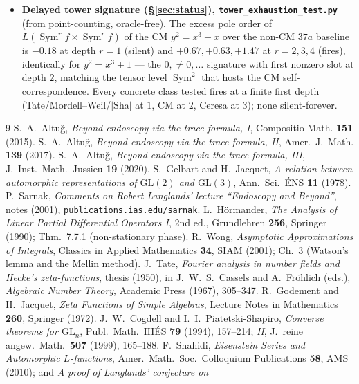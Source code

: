 \documentclass[11pt]{article}
\theoremstyle{definition}
\newcommand{\Sym}{\operatorname{Sym}}
\newcommand{\Sha}{\mathrm{Sha}}
\begin{document}
\begin{itemize}
\item \textbf{Delayed tower signature (\S\ref{sec:status}), \texttt{tower\_exhaustion\_test.py}}
(from point-counting, oracle-free). The excess pole order of $L(\Sym^r f\times\Sym^r f)$ of the CM
$y^2=x^3-x$ over the non-CM $37a$ baseline is $-0.18$ at depth $r=1$ (silent) and $+0.67,+0.63,+1.47$ at
$r=2,3,4$ (fires), identically for $y^2=x^3+1$ --- the $0,\neq0,\dots$ signature with first nonzero slot
at depth $2$, matching the tensor level $\Sym^2$ that hosts the CM self-correspondence. Every concrete
class tested fires at a finite first depth (Tate/Mordell--Weil/$|\Sha|$ at $1$, CM at $2$, Ceresa at $3$);
none silent-forever.
\end{itemize}

\begin{thebibliography}{9}
 S.~A.~Altu\u{g}, \emph{Beyond endoscopy via the trace formula, I}, Compositio Math.
\textbf{151} (2015).
 S.~A.~Altu\u{g}, \emph{Beyond endoscopy via the trace formula, II}, Amer.\ J.\ Math.
\textbf{139} (2017).
 S.~A.~Altu\u{g}, \emph{Beyond endoscopy via the trace formula, III}, J.\ Inst.\
Math.\ Jussieu \textbf{19} (2020).
 S.~Gelbart and H.~Jacquet, \emph{A relation between automorphic representations of
$\mathrm{GL}(2)$ and $\mathrm{GL}(3)$}, Ann.\ Sci.\ \'ENS \textbf{11} (1978).
\bibitem{Sar} P.~Sarnak, \emph{Comments on Robert Langlands' lecture ``Endoscopy and Beyond''}, notes
(2001), \texttt{publications.ias.edu/sarnak}.
 L.~H\"ormander, \emph{The Analysis of Linear Partial Differential Operators I},
2nd ed., Grundlehren \textbf{256}, Springer (1990); Thm.~7.7.1 (non-stationary phase).
\bibitem{Wong} R.~Wong, \emph{Asymptotic Approximations of Integrals}, Classics in Applied
Mathematics \textbf{34}, SIAM (2001); Ch.~3 (Watson's lemma and the Mellin method).
\bibitem{Tate} J.~Tate, \emph{Fourier analysis in number fields and Hecke's zeta-functions}, thesis
(1950), in J.~W.~S.~Cassels and A.~Fr\"ohlich (eds.), \emph{Algebraic Number Theory}, Academic Press
(1967), 305--347.
 R.~Godement and H.~Jacquet, \emph{Zeta Functions of Simple Algebras}, Lecture Notes in
Mathematics \textbf{260}, Springer (1972).
 J.~W.~Cogdell and I.~I.~Piatetski-Shapiro, \emph{Converse theorems for
$\mathrm{GL}_n$}, Publ.\ Math.\ IH\'ES \textbf{79} (1994), 157--214; \emph{II}, J.\ reine angew.\
Math.\ \textbf{507} (1999), 165--188.
\bibitem{Shahidi} F.~Shahidi, \emph{Eisenstein Series and Automorphic $L$-functions}, Amer.\ Math.\
Soc.\ Colloquium Publications \textbf{58}, AMS (2010); and \emph{A proof of Langlands' conjecture on
}
\end{thebibliography}
\end{document}
